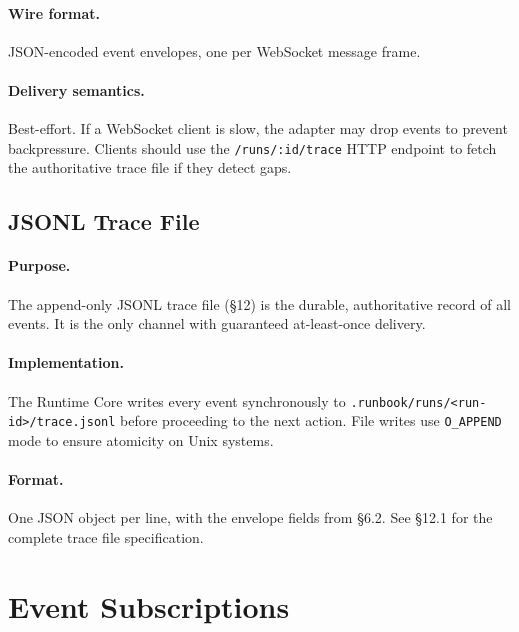 \paragraph{Wire format.} JSON-encoded event envelopes, one per WebSocket message frame.

\paragraph{Delivery semantics.} Best-effort. If a WebSocket client is slow, the adapter may drop events to prevent backpressure. Clients should use the \texttt{/runs/:id/trace} HTTP endpoint to fetch the authoritative trace file if they detect gaps.


\subsection{JSONL Trace File}

\paragraph{Purpose.} The append-only JSONL trace file (§12) is the durable, authoritative record of all events. It is the only channel with guaranteed at-least-once delivery.

\paragraph{Implementation.} The Runtime Core writes every event synchronously to \texttt{.runbook/runs/<run-id>/trace.jsonl} before proceeding to the next action. File writes use \texttt{O\_APPEND} mode to ensure atomicity on Unix systems.

\paragraph{Format.} One JSON object per line, with the envelope fields from §6.2. See §12.1 for the complete trace file specification.

\section{Event Subscriptions}


